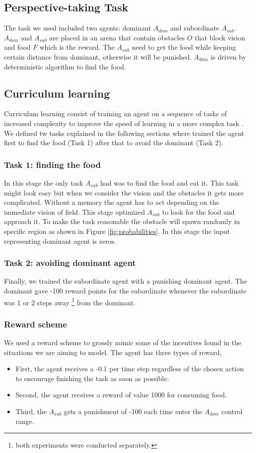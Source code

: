\documentclass{article}
\begin{document}
\subsection{Perspective-taking Task}
The task we used included two agents: dominant $A_{dom}$ and subordinate $A_{sub}$. $A_{dom}$ and $A_{sub}$ are placed in an arena that contain obstacles $O$ that block vision and food $F$ which is the reward. The $A_{sub}$  need to get the food while keeping certain distance from dominant, otherwise it will be punished. $A_{dom}$ is driven by deterministic algorithm to find the food.
\subsection{Curriculum learning}
Curriculum learning consist of training an agent on a sequence of tasks of increased complexity to improve the speed of learning in a more complex task \cite{narvekar2016curriculum}. We defined tw tasks explained in the following sections where trained the agent first to find the food (Task 1) after that to avoid the dominant (Task 2).
\subsubsection{Task 1: finding the food} \label{task1}
In this stage the only task \(A_{sub}\) had was to find the food and eat it. This task might look easy but when we consider the vision and the obstacles it gets more complicated. Without a memory the agent has to act depending on the immediate vision of field. This stage optimized \(A_{sub}\) to look for the food and approach it. To make the task reasonable the obstacle will spawn randomly in specific region as shown in Figure \ref{fig:probabilities}. In this stage the input representing dominant agent is zeros.

\subsubsection{Task 2: avoiding dominant agent}\label{task2}
Finally, we trained the subordinate agent with a punishing dominant agent. The dominant gave -100 reward points for the subordinate whenever the subordinate was 1 or 2 steps away \footnote{both experiments were conducted separately.} from the dominant. 

\subsubsection{Reward scheme \label{reward.scheme}}
We used a reward scheme to grossly mimic some of the incentives found in the situations we are aiming to model. The agent has three types of reward,
\begin{itemize}
\item First, the agent receives a -0.1 per time step regardless of the chosen action to encourage finishing the task as soon as possible.
\item Second, the agent receives a reward of value 1000 for consuming food.
\item Third, the $A_{sub}$ gets a punishment of -100 each time enter the $A_{dom}$ control range.
\end{itemize}  
\end{document}
